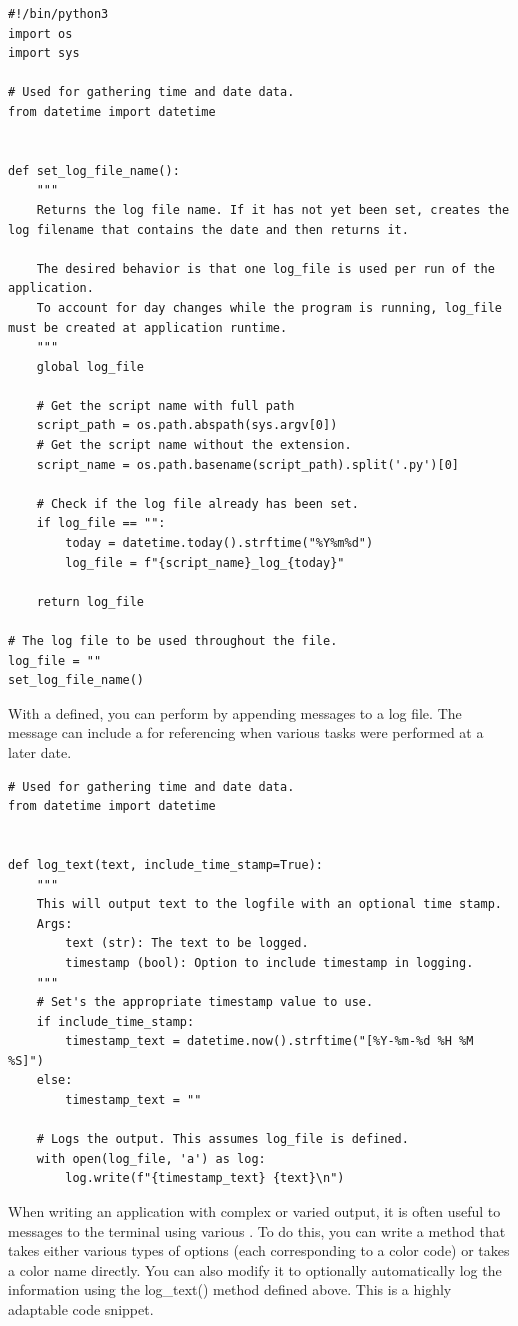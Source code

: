 \begin{lstlisting}
#!/bin/python3
import os
import sys

# Used for gathering time and date data.
from datetime import datetime


def set_log_file_name():
    """
    Returns the log file name. If it has not yet been set, creates the log filename that contains the date and then returns it.
    
    The desired behavior is that one log_file is used per run of the application. 
	To account for day changes while the program is running, log_file must be created at application runtime.
    """    
    global log_file
    
    # Get the script name with full path
    script_path = os.path.abspath(sys.argv[0])
    # Get the script name without the extension.
    script_name = os.path.basename(script_path).split('.py')[0]
    
    # Check if the log file already has been set.
    if log_file == "":
        today = datetime.today().strftime("%Y%m%d")
        log_file = f"{script_name}_log_{today}"
        
    return log_file

# The log file to be used throughout the file.
log_file = ""
set_log_file_name()
\end{lstlisting}

With a  defined, you can perform  by appending messages to a log file. The message can include a  for referencing when various tasks were performed at a later date.

\begin{lstlisting}
# Used for gathering time and date data.
from datetime import datetime


def log_text(text, include_time_stamp=True):
    """
    This will output text to the logfile with an optional time stamp.
    Args:        
        text (str): The text to be logged.
        timestamp (bool): Option to include timestamp in logging.    
    """
    # Set's the appropriate timestamp value to use.
    if include_time_stamp:
        timestamp_text = datetime.now().strftime("[%Y-%m-%d %H %M %S]")
    else:
        timestamp_text = ""

    # Logs the output. This assumes log_file is defined.
    with open(log_file, 'a') as log:            
        log.write(f"{timestamp_text} {text}\n")
\end{lstlisting}

When writing an application with complex or varied output, it is often useful to  messages to the terminal using various . To do this, you can write a method that takes either various types of options (each corresponding to a color code) or takes a color name directly. You can also modify it to optionally automatically log the information using the log\_text() method defined above. This is a highly adaptable code snippet.

